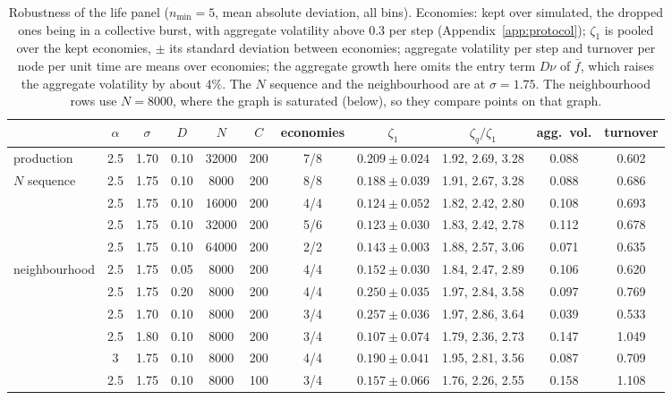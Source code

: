 \documentclass[pre,twocolumn,superscriptaddress,nofootinbib]{revtex4-2}
\begin{document}
\begin{table}[t]
\caption{Robustness of the life panel ($n_{\min}=5$, mean absolute deviation, all bins).  Economies: kept
over simulated, the dropped ones being in a collective burst, with aggregate volatility above $0.3$ per step
(Appendix~\ref{app:protocol}); $\zeta_1$ is pooled over the kept economies, $\pm$ its standard
deviation between economies; aggregate volatility per step and turnover per node per unit time are
means over economies; the aggregate growth here omits the entry term $D\nu$ of $\bar f$, which raises the aggregate
volatility by about $4\%$.  The $N$ sequence and the neighbourhood are at $\sigma=1.75$.  The neighbourhood rows
use $N=8000$, where the graph is saturated (below), so they compare points on that graph.}
\label{tab:robust}
\begin{ruledtabular}
\begin{tabular}{lcccccccccc}
 & $\alpha$ & $\sigma$ & $D$ & $N$ & $C$ & economies & $\zeta_1$ & $\zeta_q/\zeta_1$ & agg.\ vol. & turnover\\
\hline
production & 2.5 & 1.70 & 0.10 & 32000 & 200 & 7/8 & $0.209\pm0.024$ & 1.92, 2.69, 3.28 & 0.088 & 0.602\\
\hline
$N$ sequence & 2.5 & 1.75 & 0.10 & 8000 & 200 & 8/8 & $0.188\pm0.039$ & 1.91, 2.67, 3.28 & 0.088 & 0.686\\
 & 2.5 & 1.75 & 0.10 & 16000 & 200 & 4/4 & $0.124\pm0.052$ & 1.82, 2.42, 2.80 & 0.108 & 0.693\\
 & 2.5 & 1.75 & 0.10 & 32000 & 200 & 5/6 & $0.123\pm0.030$ & 1.83, 2.42, 2.78 & 0.112 & 0.678\\
 & 2.5 & 1.75 & 0.10 & 64000 & 200 & 2/2 & $0.143\pm0.003$ & 1.88, 2.57, 3.06 & 0.071 & 0.635\\
\hline
neighbourhood & 2.5 & 1.75 & 0.05 & 8000 & 200 & 4/4 & $0.152\pm0.030$ & 1.84, 2.47, 2.89 & 0.106 & 0.620\\
 & 2.5 & 1.75 & 0.20 & 8000 & 200 & 4/4 & $0.250\pm0.035$ & 1.97, 2.84, 3.58 & 0.097 & 0.769\\
 & 2.5 & 1.70 & 0.10 & 8000 & 200 & 3/4 & $0.257\pm0.036$ & 1.97, 2.86, 3.64 & 0.039 & 0.533\\
 & 2.5 & 1.80 & 0.10 & 8000 & 200 & 3/4 & $0.107\pm0.074$ & 1.79, 2.36, 2.73 & 0.147 & 1.049\\
 & 3 & 1.75 & 0.10 & 8000 & 200 & 4/4 & $0.190\pm0.041$ & 1.95, 2.81, 3.56 & 0.087 & 0.709\\
 & 2.5 & 1.75 & 0.10 & 8000 & 100 & 3/4 & $0.157\pm0.066$ & 1.76, 2.26, 2.55 & 0.158 & 1.108\\

\end{tabular}
\end{ruledtabular}
\end{table}
\end{document}
